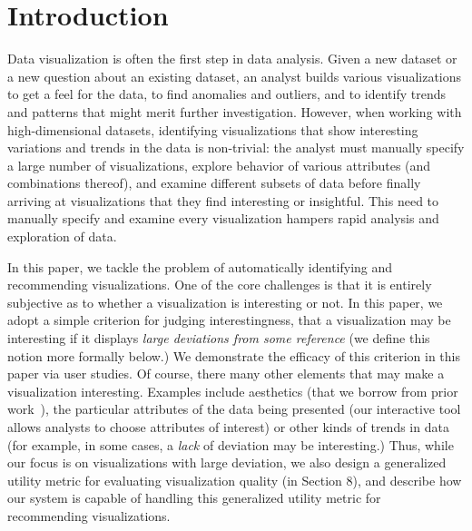 
\section{Introduction}
\label{sec:introduction}
Data visualization is often the first step in data analysis.
Given a new dataset or a new question about an existing dataset, an analyst builds
various visualizations to get a feel for the data, to find anomalies and outliers, 
and to identify trends and patterns that might merit further investigation. 
However, when working with high-dimensional datasets, identifying visualizations that
show interesting variations and trends in the data is non-trivial:
the analyst must manually specify a large number of visualizations, explore behavior of various
attributes (and combinations thereof), and examine different subsets of data before finally 
arriving at visualizations that they find interesting or insightful.
This need to manually specify and examine every visualization hampers rapid analysis 
and exploration of data.


In this paper, we tackle the problem of automatically 
identifying and recommending 
visualizations.  
One of the core challenges is that it is entirely subjective as to
whether a visualization is interesting or not.  
In this paper, we adopt a simple criterion for judging interestingness, 
that a visualization 
may be interesting if it displays 
{\em large deviations from some
reference} (we define this notion more formally below.)
We demonstrate the efficacy of this criterion in this paper via 
user studies. 
Of course, there many other elements that may make a visualization interesting.
Examples include aesthetics (that 
we borrow from prior work~\cite{polaris,Mackinlay:1986:ADG:22949.22950}), 
the particular attributes of the data being presented 
(our interactive tool allows analysts to choose attributes of interest) 
or other kinds of trends in
data (for example, in some cases, a {\it lack} of deviation may be interesting.)  
Thus, while our focus is on visualizations with large deviation, 
we also design a generalized utility metric for evaluating visualization 
quality (in Section 8), and describe how our system is capable of handling
this generalized utility metric for recommending visualizations.


